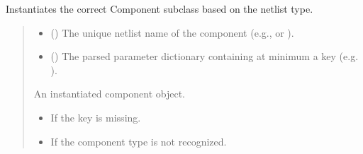 \documentclass[letterpaper,10pt,english]{sphinxmanual}
\begin{document}
\begin{fulllineitems}
\label{\detokenize{circuit:create_component}}
\pysigstartsignatures
\pysiglinewithargsret
{}
{\sphinxparamcomma {}}
{}
\pysigstopsignatures
\sphinxAtStartPar
Instantiates the correct Component subclass based on the netlist type.
\begin{quote}\begin{description}
\begin{itemize}
\item {} 
\sphinxAtStartPar
{} () \textendash{} The unique netlist name of the component (e.g.,  or ).

\item {} 
\sphinxAtStartPar
{} () \textendash{} The parsed parameter dictionary containing at minimum a  key
(e.g. ).

\end{itemize}

\sphinxAtStartPar
An instantiated component object.

\sphinxAtStartPar
{\hyperref[\detokenize{component_base:Component}]{}}

\begin{itemize}
\item {} 
\sphinxAtStartPar
{} \textendash{} If the  key is missing.

\item {} 
\sphinxAtStartPar
{} \textendash{} If the component type is not recognized.

\end{itemize}

\end{description}\end{quote}

\end{fulllineitems}
\end{document}
